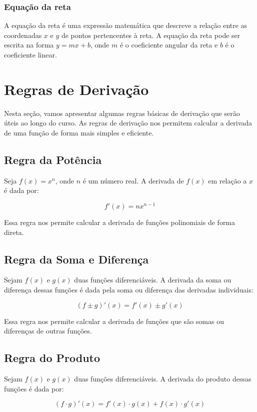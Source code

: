\documentclass[12pt]{article}
\begin{document}
\subsubsection{Equação da reta}
A equação da reta é uma expressão matemática que descreve a relação entre as coordenadas $x$ e $y$ de pontos pertencentes à reta. A equação da reta pode ser escrita na forma $y = mx + b$, onde $m$ é o coeficiente angular da reta e $b$ é o coeficiente linear.


\section{Regras de Derivação}
Nesta seção, vamos apresentar algumas regras básicas de derivação que serão úteis ao longo do curso. As regras de derivação nos permitem calcular a derivada de uma função de forma mais simples e eficiente.

\subsection{Regra da Potência}
Seja $f(x) = x^n$, onde $n$ é um número real. A derivada de $f(x)$ em relação a $x$ é dada por:

\[
f'(x) = nx^{n-1}
\]

Essa regra nos permite calcular a derivada de funções polinomiais de forma direta.

\subsection{Regra da Soma e Diferença}

Sejam $f(x)$ e $g(x)$ duas funções diferenciáveis. A derivada da soma ou diferença dessas funções é dada pela soma ou diferença das derivadas individuais:

\[
(f \pm g)'(x) = f'(x) \pm g'(x)
\]

Essa regra nos permite calcular a derivada de funções que são somas ou diferenças de outras funções.

\subsection{Regra do Produto}

Sejam $f(x)$ e $g(x)$ duas funções diferenciáveis. A derivada do produto dessas funções é dada por:

\[
(f \cdot g)'(x) = f'(x) \cdot g(x) + f(x) \cdot g'(x)
\]
\end{document}
